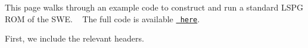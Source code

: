

\begin{DoxyParagraph}{}
This page walks through an example code to construct and run a standard LSPG ROM of the SWE. ~\newline
 The full code is available \href{https://github.com/Pressio/pressio-tutorials/blob/swe2d_tutorial/tutorials/swe2d/online_phase/lspg_rom/run_lspg.cc}{\texttt{ here}}.
\end{DoxyParagraph}
First, we include the relevant headers. 
\begin{DoxyCode}{0}

\end{DoxyCode}


